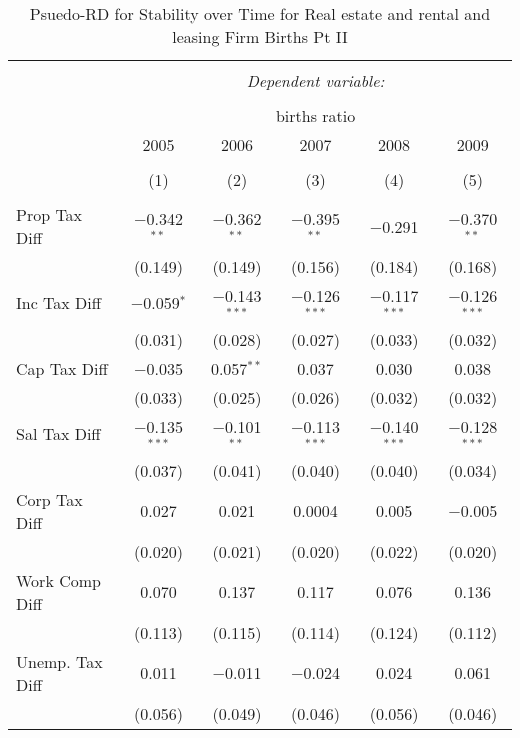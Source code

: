 
\begin{table}[!htbp] \centering 
  \caption{Psuedo-RD for Stability over Time for  Real estate and rental and leasing Firm Births Pt II} 
  \label{53year} 
\small 
\begin{tabular}{@{\extracolsep{5pt}}lccccc} 
\\[-1.8ex]\hline 
\hline \\[-1.8ex] 
 & \multicolumn{5}{c}{\textit{Dependent variable:}} \\ 
\cline{2-6} 
\\[-1.8ex] & \multicolumn{5}{c}{births ratio} \\ 
 & 2005 & 2006 & 2007 & 2008 & 2009 \\ 
\\[-1.8ex] & (1) & (2) & (3) & (4) & (5)\\ 
\hline \\[-1.8ex] 
 Prop Tax Diff & $-$0.342$^{**}$ & $-$0.362$^{**}$ & $-$0.395$^{**}$ & $-$0.291 & $-$0.370$^{**}$ \\ 
  & (0.149) & (0.149) & (0.156) & (0.184) & (0.168) \\ 
  Inc Tax Diff & $-$0.059$^{*}$ & $-$0.143$^{***}$ & $-$0.126$^{***}$ & $-$0.117$^{***}$ & $-$0.126$^{***}$ \\ 
  & (0.031) & (0.028) & (0.027) & (0.033) & (0.032) \\ 
  Cap Tax Diff & $-$0.035 & 0.057$^{**}$ & 0.037 & 0.030 & 0.038 \\ 
  & (0.033) & (0.025) & (0.026) & (0.032) & (0.032) \\ 
  Sal Tax Diff & $-$0.135$^{***}$ & $-$0.101$^{**}$ & $-$0.113$^{***}$ & $-$0.140$^{***}$ & $-$0.128$^{***}$ \\ 
  & (0.037) & (0.041) & (0.040) & (0.040) & (0.034) \\ 
  Corp Tax Diff & 0.027 & 0.021 & 0.0004 & 0.005 & $-$0.005 \\ 
  & (0.020) & (0.021) & (0.020) & (0.022) & (0.020) \\ 
  Work Comp Diff & 0.070 & 0.137 & 0.117 & 0.076 & 0.136 \\ 
  & (0.113) & (0.115) & (0.114) & (0.124) & (0.112) \\ 
  Unemp. Tax Diff & 0.011 & $-$0.011 & $-$0.024 & 0.024 & 0.061 \\ 
  & (0.056) & (0.049) & (0.046) & (0.056) & (0.046) \\ 

\end{tabular}
\end{table}
